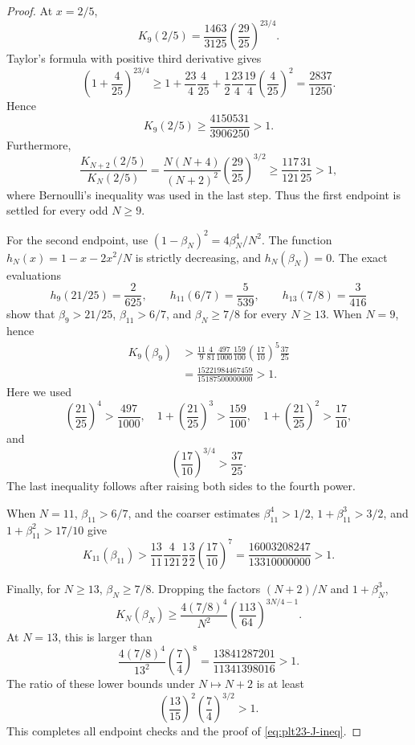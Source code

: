 \documentclass[11pt]{article}
\numberwithin{equation}{section}
\begin{document}
\begin{proof}
  At $x=2/5$,
  \[
    K_9(2/5)=\frac{1463}{3125}
    \left(\frac{29}{25}\right)^{23/4}.
  \]
  Taylor's formula with positive third derivative gives
  \[
    \left(1+\frac{4}{25}\right)^{23/4}
    \ge1+\frac{23}{4}\frac{4}{25}
    +\frac{1}{2}\frac{23}{4}\frac{19}{4}
    \left(\frac{4}{25}\right)^2
    =\frac{2837}{1250}.
  \]
  Hence
  \[
    K_9(2/5)\ge\frac{4150531}{3906250}>1.
  \]
  Furthermore,
  \[
    \frac{K_{N+2}(2/5)}{K_N(2/5)}
    =\frac{N(N+4)}{(N+2)^2}
    \left(\frac{29}{25}\right)^{3/2}
    \ge\frac{117}{121}\frac{31}{25}>1,
  \]
  where Bernoulli's inequality was used in the last step.  Thus the first
  endpoint is settled for every odd $N\ge9$.

  For the second endpoint, use
  $(1-\beta_N)^2=4\beta_N^4/N^2$.  The function
  $h_N(x)=1-x-2x^2/N$ is strictly decreasing, and $h_N(\beta_N)=0$.
  The exact evaluations
  \[
    h_9(21/25)=\frac{2}{625},\qquad
    h_{11}(6/7)=\frac{5}{539},\qquad
    h_{13}(7/8)=\frac{3}{416}
  \]
  show that $\beta_9>21/25$, $\beta_{11}>6/7$, and
  $\beta_N\ge7/8$ for every $N\ge13$.  When $N=9$, hence
  \begin{align*}
    K_9(\beta_9)
    &>\frac{11}{9}\frac{4}{81}
    \frac{497}{1000}\frac{159}{100}
    \left(\frac{17}{10}\right)^5\frac{37}{25}\\
    &=\frac{15221984467459}{15187500000000}>1.
  \end{align*}
  Here we used
  \[
    \left(\frac{21}{25}\right)^4>\frac{497}{1000},
    \quad
    1+\left(\frac{21}{25}\right)^3>\frac{159}{100},
    \quad
    1+\left(\frac{21}{25}\right)^2>\frac{17}{10},
  \]
  and
  \[
    \left(\frac{17}{10}\right)^{3/4}>\frac{37}{25}.
  \]
  The last inequality follows after raising both sides to the fourth power.

  When $N=11$, $\beta_{11}>6/7$, and the coarser estimates
  $\beta_{11}^4>1/2$, $1+\beta_{11}^3>3/2$, and
  $1+\beta_{11}^2>17/10$ give
  \[
    K_{11}(\beta_{11})
    >\frac{13}{11}\frac{4}{121}\frac{1}{2}\frac{3}{2}
    \left(\frac{17}{10}\right)^7
    =\frac{16003208247}{13310000000}>1.
  \]

  Finally, for $N\ge13$, $\beta_N\ge7/8$.  Dropping the factors
  $(N+2)/N$ and $1+\beta_N^3$,
  \[
    K_N(\beta_N)
    \ge\frac{4(7/8)^4}{N^2}
    \left(\frac{113}{64}\right)^{3N/4-1}.
  \]
  At $N=13$, this is larger than
  \[
    \frac{4(7/8)^4}{13^2}\left(\frac{7}{4}\right)^8
    =\frac{13841287201}{11341398016}>1.
  \]
  The ratio of these lower bounds under $N\mapsto N+2$ is at least
  \[
    \left(\frac{13}{15}\right)^2
    \left(\frac{7}{4}\right)^{3/2}>1.
  \]
  This completes all endpoint checks and the proof of
  \eqref{eq:plt23-J-ineq}.
\end{proof}
\end{document}
